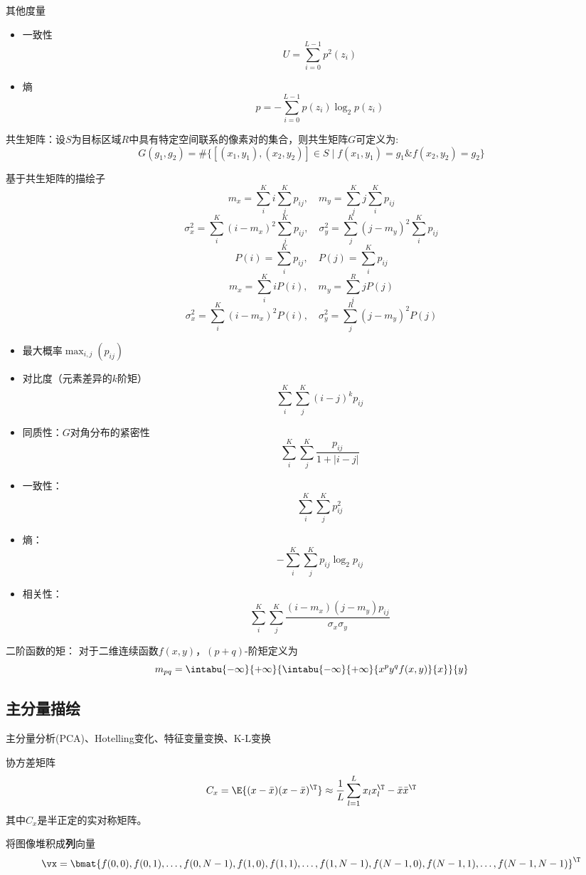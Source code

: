 其他度量
\begin{itemize}
	\item 一致性
	\[U=\sum_{i=0}^{L-1}p^2(z_i)\]
	\item 熵
	\[p=-\sum_{i=0}^{L-1}p(z_i)\log_2p(z_i)\]
\end{itemize}

共生矩阵：设$S$为目标区域$R$中具有特定空间联系的像素对的集合，则共生矩阵$G$可定义为:
\[G(g_1,g_2)=\#\{[(x_1,y_1),(x_2,y_2)]\in S\mid f(x_1,y_1)=g_1 \& f(x_2,y_2)=g_2\}\]

基于共生矩阵的描绘子
\[m_{x}=\sum_{i}^{K} i \sum_{j}^{K} p_{ij}, \quad m_{y}=\sum_{j}^{K} j \sum_{i}^{K} p_{ij}\]
\[\sigma_{x}^{2}=\sum_{i}^{K}\left(i-m_{x}\right)^{2} \sum_{j}^{K} p_{ij}, \quad \sigma_{y}^{2}=\sum_{j}^{K}\left(j-m_{y}\right)^{2} \sum_{i}^{K} p_{ij}\]
\[P(i)=\sum_{i}^{K} p_{ij}, \quad P(j)=\sum_{i}^{K} p_{ij}\]
\[m_{x}=\sum_{i}^{K} iP(i), \quad m_{y}=\sum_{i}^{R} jP(j)\]
\[\sigma_{x}^{2}=\sum_{i}^{K}\left(i-m_{x}\right)^{2} P(i), \quad \sigma_{y}^{2}=\sum_{j}^{R}\left(j-m_{y}\right)^{2} P(j)\]
\begin{itemize}
	\item 最大概率$\max_{i,j}(p_{ij})$
	\item 对比度（元素差异的$k$阶矩）
	\[\sum_i^K\sum_j^K(i-j)^kp_{ij}\]
	\item 同质性：$G$对角分布的紧密性
	\[\sum_i^K\sum_j^K \frac{p_{ij}}{1+|i-j|}\]
	\item 一致性：
	\[\sum_i^K\sum_j^K p_{ij}^2\]
	\item 熵：
	\[-\sum_i^K\sum_j^K p_{ij}\log_2 p_{ij}\]
	\item 相关性：
	\[\sum_i^K\sum_j^K\frac{(i-m_x)(j-m_y)p_{ij}}{\sigma_x\sigma_y}\]
\end{itemize}

二阶函数的矩：
对于二维连续函数$f(x,y)$，$(p+q)$-阶矩定义为
\[m_{pq}=\intabu{-\infty}{+\infty}{\intabu{-\infty}{+\infty}{x^py^qf(x,y)}{x}}{y}\]


\subsection{主分量描绘}
主分量分析(PCA)、Hotelling变化、特征变量变换、K-L变换

协方差矩阵
\[C_x=\E{(x-\bar{x})(x-\bar{x})^\T}\approx\frac{1}{L}\sum_{l=1}^Lx_lx_l^\T-\bar{x}\bar{x}^\T\]
其中$C_x$是半正定的实对称矩阵。

将图像堆积成\textbf{列}向量
\[\vx=\bmat{f(0,0), f(0,1), \ldots, f(0,N-1), f(1,0), f(1,1), \ldots, f(1,N-1), f(N-1,0), f(N-1,1), \ldots, f(N-1,N-1)}^\T\]

